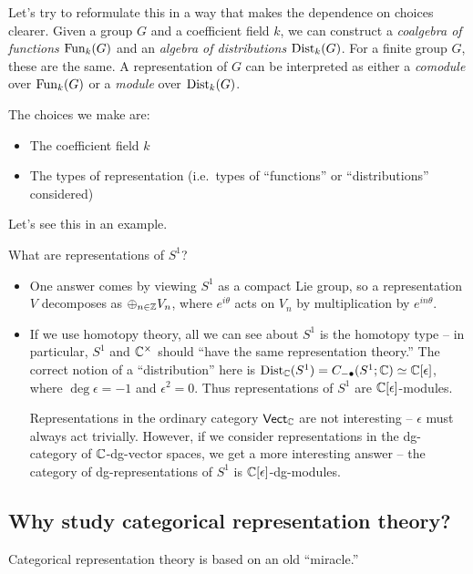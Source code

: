 \documentclass{article}
\begin{document}
Let's try to reformulate this in a way that makes the dependence on choices clearer.
Given a group $G$ and a coefficient field $k$, we can construct a \emph{coalgebra of functions} $\operatorname{Fun}_k(G)$ and an \emph{algebra of distributions} $\operatorname{Dist}_k(G)$.
For a finite group $G$, these are the same.
A representation of $G$ can be interpreted as either a \emph{comodule} over $\operatorname{Fun}_k(G)$ or a \emph{module} over $\operatorname{Dist}_k(G)$.

The choices we make are:
\begin{itemize}
	\item The coefficient field $k$
	\item The types of representation (i.e.\ types of ``functions'' or ``distributions'' considered)
\end{itemize}

Let's see this in an example.

\begin{ex}
	What are representations of $S^1$?
	\begin{itemize}
		\item One answer comes by viewing $S^1$ as a compact Lie group, so a representation $V$ decomposes as $\oplus_{n \in \mathbb{Z}} V_n$, where $e^{i \theta}$ acts on $V_n$ by multiplication by $e^{in\theta}$.
		\item If we use homotopy theory, all we can see about $S^1$ is the homotopy type -- in particular, $S^1$ and $\mathbb{C}^\times$ should ``have the same representation theory.''
			The correct notion of a ``distribution'' here is $\operatorname{Dist}_{\mathbb{C}}(S^1) = C_{-\bullet}(S^1; \mathbb{C}) \simeq \mathbb{C}[\epsilon]$, where $\deg \epsilon = -1$ and $\epsilon^2 = 0$.
			Thus representations of $S^1$ are $\mathbb{C}[\epsilon]$-modules.

			Representations in the ordinary category $\mathsf{Vect}_{\mathbb{C}}$ are not interesting -- $\epsilon$ must always act trivially.
			However, if we consider representations in the dg-category of $\mathbb{C}$-dg-vector spaces, we get a more interesting answer -- the category of dg-representations of $S^1$ is $\mathbb{C}[\epsilon]$-dg-modules.
	\end{itemize}
\end{ex}

\subsection{Why study categorical representation theory?}

Categorical representation theory is based on an old ``miracle.''
\end{document}
